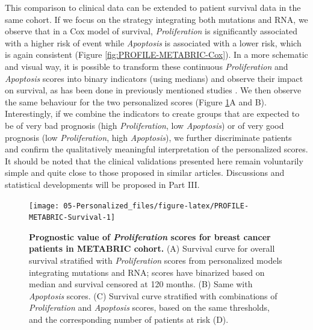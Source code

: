 \documentclass[a4paper,12pt,twoside,onecolumn,openright,final,oldfontcommands]{memoir}
\begin{document}
This comparison to clinical data can be extended to patient survival
data in the same cohort. If we focus on the strategy integrating both
mutations and RNA, we observe that in a Cox model of survival,
\emph{Proliferation} is significantly associated with a higher risk of
event while \emph{Apoptosis} is associated with a lower risk, which is
again consistent (Figure \ref{fig:PROFILE-METABRIC-Cox}). In a more
schematic and visual way, it is possible to transform these continuous
\emph{Proliferation} and \emph{Apoptosis} scores into binary indicators
(using medians) and observe their impact on survival, as has been done
in previously mentioned studies
\citep{fey2015signaling, salvucci2019system}. We then observe the same
behaviour for the two personalized scores (Figure
\ref{fig:PROFILE-METABRIC-Survival}A and B). Interestingly, if we
combine the indicators to create groups that are expected to be of very
bad prognosis (high \emph{Proliferation}, low \emph{Apoptosis}) or of
very good prognosis (low \emph{Proliferation}, high \emph{Apoptosis}),
we further discriminate patients and confirm the qualitatively
meaningful interpretation of the personalized scores. It should be noted
that the clinical validations presented here remain voluntarily simple
and quite close to those proposed in similar articles. Discussions and
statistical developments will be proposed in Part III.

\begin{figure}

{\centering \texttt{[image: 05-Personalized\_files/figure-latex/PROFILE-METABRIC-Survival-1]} 

}

\caption[Prognostic value of *Proliferation* scores for breast cancer patients in METABRIC cohort]{\textbf{Prognostic value of
\emph{Proliferation} scores for breast cancer patients in METABRIC
cohort.} (A) Survival curve for overall survival stratified with
\emph{Proliferation} scores from personalized models integrating
mutations and RNA; scores have binarized based on median and survival
censored at 120 months. (B) Same with \emph{Apoptosis} scores. (C)
Survival curve stratified with combinations of \emph{Proliferation} and
\emph{Apoptosis} scores, based on the same thresholds, and the
corresponding number of patients at risk (D).}\label{fig:PROFILE-METABRIC-Survival}
\end{figure}
\end{document}

